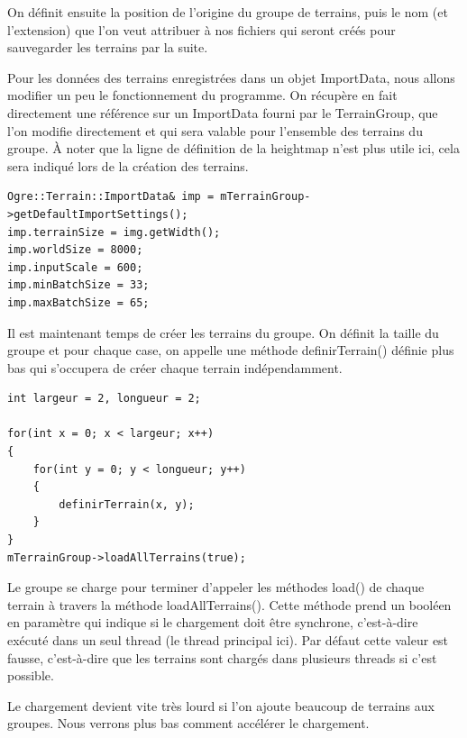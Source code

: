 On d\'efinit ensuite la position de l'origine du groupe de terrains, puis le nom (et l'extension) que l'on veut attribuer \`a nos fichiers qui seront cr\'e\'es pour sauvegarder les terrains par la suite.

Pour les donn\'ees des terrains enregistr\'ees dans un objet ImportData, nous allons modifier un peu le fonctionnement du programme. On r\'ecup\`ere en fait directement une r\'ef\'erence sur un ImportData fourni par le TerrainGroup, que l'on modifie directement et qui sera valable pour l'ensemble des terrains du groupe. \`A noter que la ligne de d\'efinition de la heightmap n'est plus utile ici, cela sera indiqu\'e lors de la cr\'eation des terrains.

\begin{lstlisting}[caption={}]
Ogre::Terrain::ImportData& imp = mTerrainGroup->getDefaultImportSettings();
imp.terrainSize = img.getWidth();
imp.worldSize = 8000;
imp.inputScale = 600;
imp.minBatchSize = 33;
imp.maxBatchSize = 65;
\end{lstlisting}

Il est maintenant temps de cr\'eer les terrains du groupe. On d\'efinit la taille du groupe et pour chaque case, on appelle une m\'ethode definirTerrain() d\'efinie plus bas qui s'occupera de cr\'eer chaque terrain ind\'ependamment.

\begin{lstlisting}[caption={Cr\'eation des terrains du groupe}]
int largeur = 2, longueur = 2;

for(int x = 0; x < largeur; x++)
{
    for(int y = 0; y < longueur; y++)
    {
        definirTerrain(x, y);
    }
}
mTerrainGroup->loadAllTerrains(true);
\end{lstlisting}

Le groupe se charge pour terminer d'appeler les m\'ethodes load() de chaque terrain \`a travers la m\'ethode loadAllTerrains(). Cette m\'ethode prend un bool\'een en param\`etre qui indique si le chargement doit \^etre synchrone, c'est-\`a-dire ex\'ecut\'e dans un seul thread (le thread principal ici). Par d\'efaut cette valeur est fausse, c'est-\`a-dire que les terrains sont charg\'es dans plusieurs threads si c'est possible.

Le chargement devient vite tr\`es lourd si l'on ajoute beaucoup de terrains aux groupes. Nous verrons plus bas comment acc\'el\'erer le chargement.


